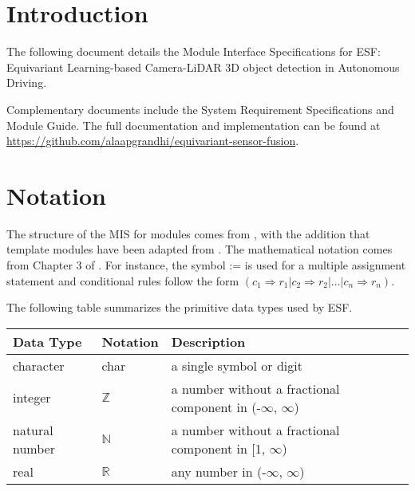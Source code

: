 \documentclass[12pt, titlepage]{article}
\newcommand{\ProjectName}{ESF}
\begin{document}
\newpage

\tableofcontents

\newpage


\section{Introduction}

The following document details the Module Interface Specifications for
\ProjectName: Equivariant Learning-based Camera-LiDAR 3D object detection in Autonomous Driving.

Complementary documents include the System Requirement Specifications
and Module Guide.  The full documentation and implementation can be
found at \url{https://github.com/alaapgrandhi/equivariant-sensor-fusion}.

\section{Notation}

The structure of the MIS for modules comes from \citet{HoffmanAndStrooper1995},
with the addition that template modules have been adapted from
\cite{GhezziEtAl2003}.  The mathematical notation comes from Chapter 3 of
\citet{HoffmanAndStrooper1995}.  For instance, the symbol := is used for a
multiple assignment statement and conditional rules follow the form $(c_1
\Rightarrow r_1 | c_2 \Rightarrow r_2 | ... | c_n \Rightarrow r_n )$.

The following table summarizes the primitive data types used by \ProjectName. 

\begin{center}
\renewcommand{\arraystretch}{1.2}
\noindent 
\begin{tabular}{l l p{7.5cm}} 
\toprule 
\textbf{Data Type} & \textbf{Notation} & \textbf{Description}\\ 
\midrule
character & char & a single symbol or digit\\
integer & $\mathbb{Z}$ & a number without a fractional component in (-$\infty$, $\infty$) \\
natural number & $\mathbb{N}$ & a number without a fractional component in [1, $\infty$) \\
real & $\mathbb{R}$ & any number in (-$\infty$, $\infty$)\\
\bottomrule
\end{tabular} 
\end{center}
\end{document}
